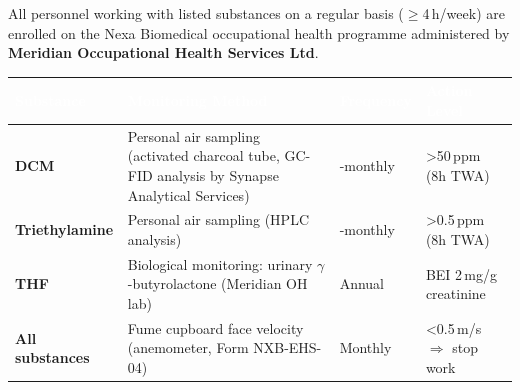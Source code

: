 
\vspace{10pt}


\vspace{4pt}

{\small
All personnel working with listed substances on a regular basis
($\geq$4\,h/week) are enrolled on the Nexa Biomedical occupational health
programme administered by \textbf{Meridian Occupational Health Services Ltd}.
}

\vspace{6pt}

\noindent
\begin{tabularx}{\linewidth}{@{}
  >{\small\bfseries}p{3.2cm}
  >{\small}X
  >{\small\centering}p{2.0cm}
  >{\small\centering\arraybackslash}p{2.2cm}
  @{}}
\toprule
\rowcolor{NavyDeep}
\textcolor{white}{\textbf{Substance}} &
\textcolor{white}{\textbf{Monitoring Method}} &
\textcolor{white}{\textbf{Frequency}} &
\textcolor{white}{\textbf{Action Level}} \\
\midrule
\rowcolor{LightFog}
DCM &
Personal air sampling (activated charcoal tube, GC-FID analysis by
Synapse Analytical Services) &
6-monthly &
\textgreater{}50\,ppm (8h TWA) \\
\rowcolor{white}
Triethylamine &
Personal air sampling (HPLC analysis) &
6-monthly &
\textgreater{}0.5\,ppm (8h TWA) \\
\rowcolor{LightFog}
THF &
Biological monitoring: urinary $\gamma$-butyrolactone
(Meridian OH lab) &
Annual &
BEI 2\,mg/g creatinine \\
\rowcolor{white}
All substances &
Fume cupboard face velocity (anemometer, Form NXB-EHS-04) &
Monthly &
\textless{}0.5\,m/s $\Rightarrow$ stop work \\
\bottomrule
\end{tabularx}

\vspace{6pt}

